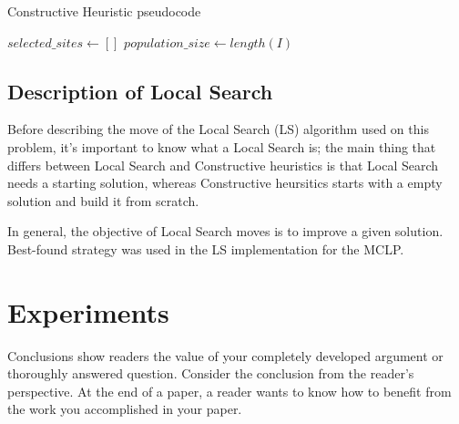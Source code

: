 \documentclass[11pt, a4paper]{article}
\begin{document}
\begin{algorithm}[H]
	\caption{Constructive Heuristic pseudocode}\label{pseudo: ch}
	\SetAlgoLined

	\KwResult{}
	$selected\_sites \gets []$\;
	$population\_size \gets length(I)$\;

	
\end{algorithm}

\subsection{Description of Local Search}
Before describing the move of the Local Search (LS) algorithm used on this problem, it's important to know what a Local Search is; the main thing that differs between Local Search and Constructive heuristics is that Local Search needs a starting solution, whereas Constructive heursitics starts with a empty solution and build it from scratch. 

In general, the objective of Local Search moves is to improve a given solution. Best-found strategy was used in the LS implementation for the MCLP.

\section{Experiments}\label{sec:conc} 
Conclusions show readers the value of your completely developed argument or thoroughly answered question. Consider the conclusion from the reader's perspective. At the end of a paper, a reader wants to know how to benefit from the work you accomplished in your paper. 
\end{document}
